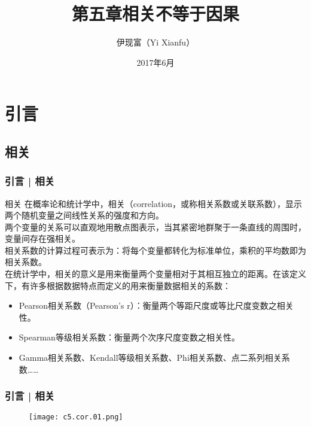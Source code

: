 



\title[相关 vs. 因果]{第五章\quad 相关不等于因果}
\author[Yixf]{伊现富（Yi Xianfu）}
\date{2017年6月}



\section{引言}
\subsection{相关}
\begin{frame}
  \frametitle{引言 | 相关}
  \begin{block}{相关}
在概率论和统计学中，相关（correlation，或称相关系数或关联系数），显示两个随机变量之间线性关系的强度和方向。\\
\vspace{0.5em}
两个变量的关系可以直观地用散点图表示，当其紧密地群聚于一条直线的周围时，变量间存在强相关。\\
\vspace{0.5em}
相关系数的计算过程可表示为：将每个变量都转化为标准单位，乘积的平均数即为相关系数。\\
\vspace{0.5em}
在统计学中，相关的意义是用来衡量两个变量相对于其相互独立的距离。在该定义下，有许多根据数据特点而定义的用来衡量数据相关的系数：
\begin{itemize}
  \item Pearson相关系数（Pearson's r）：衡量两个等距尺度或等比尺度变数之相关性。
  \item Spearman等级相关系数：衡量两个次序尺度变数之相关性。
  \item Gamma相关系数、Kendall等级相关系数、Phi相关系数、点二系列相关系数……
\end{itemize}
  \end{block}
\end{frame}

\begin{frame}
  \frametitle{引言 | 相关}
  \begin{figure}
    \centering
    \texttt{[image: c5.cor.01.png]}
  \end{figure}
\end{frame}

